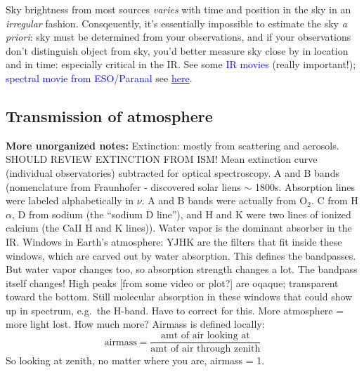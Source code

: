 \documentclass[12pt]{article}
\begin{document}
Sky brightness from most sources \emph{varies} with time and position in the
sky in an \emph{irregular} fashion. Consqeuently, it's essentially impossible
to estimate the sky \emph{a priori}: sky must be determined from your
observations, and if your observations don't distinguish object from
sky, you'd better measure sky close by in location and in time:
especially critical in the IR\@. See some
{\textcolor{blue}{IR movies}} (really important!);
{\textcolor{blue}{spectral movie from ESO/Paranal}} see
\href{https://www.astro.uni-bonn.de/theli/gui/aboutbackground.html}
{\textcolor{blue}{here}}.

\subsection{Transmission of atmosphere}

\textcolor{myBlue}{\textbf{More unorganized notes:}
    Extinction: mostly from scattering and aerosols. SHOULD REVIEW
    EXTINCTION FROM ISM\@! Mean extinction curve (individual observatories)
    subtracted for optical spectroscopy. A and B bands (nomenclature
    from Fraunhofer - discovered solar liens $\sim$ 1800s.
    Absorption lines were labeled alphabetically in $\nu$. A and B bands
    were actually from O$_2$. C from H$\alpha$, D from sodium (the
    ``sodium D line''), and H and K were two lines of ionized calcium
    (the CaII H and K lines)).
    Water vapor is the dominant absorber in the IR\@.
    Windows in Earth's atmosphere: YJHK are the filters that fit inside
    these windows, which are carved out by water absorption.
    This defines the bandpasses. But water vapor changes too,
    so absorption strength changes a lot. The bandpass itself
    changes! High peaks [from some video or plot?] are oqaque;
    transparent toward the bottom. Still molecular absorption in
    these windows that could show up in spectrum, e.g.\ the H-band.
    Have to correct for this. More atmosphere = more light lost.
    How much more? Airmass is defined locally:
    $$ \textrm{airmass} = \frac{\textrm{amt\ of air\ looking\ at}}
        {\textrm{amt\ of\ air\ through\ zenith}}$$
    So looking at zenith, no matter where you are, airmass = 1.
}
\end{document}
